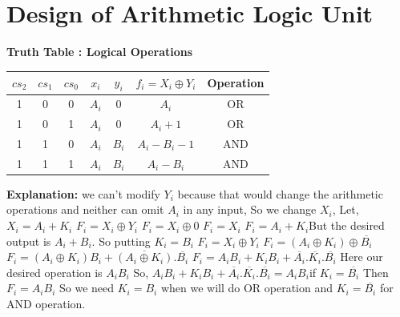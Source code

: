 \documentclass[12pt]{extarticle}
\begin{document}
	\section{Design of Arithmetic Logic Unit}
	\textbf{Truth Table : Logical Operations}
	\begin{center}
		\begin{tabular}{ |c|c|c|c|c|c|c| } 
			\hline
			$cs_2$ & $cs_1$ & $cs_0$ & $x_i$ & $y_i$ & $f_i=X_i \oplus Y_i$ & Operation \\
			\hline
			
			\hline
			1 & 0 & 0 & $A_i$ & $0$ & $A_i$ & OR \\
			\hline
			
			\hline
			1 & 0 & 1 & $A_i$ & $0$ & $A_i+1$ & OR \\
			\hline
			
			\hline
			1 & 1 & 0 & $A_i$ & $B_i$ & $A_i-B_i-1$ & AND \\
			\hline
			
			\hline
			1 & 1 & 1 & $A_i$ & $B_i$ & $A_i-B_i$ & AND\\
			\hline
		\end{tabular}
	\end{center}\textbf{Explanation:}\newline
	we can't modify $Y_i$ because that would change the arithmetic operations
	and neither can omit $A_i$ in any input, So we change $X_i$,\newline
	Let, $X_i=A_i+K_i$ \newline
	$F_i=X_i \oplus Y_i$ \newline
	$F_i=X_i \oplus 0$ \newline
	$F_i=X_i$ \newline
	$F_i=A_i+K_i$\newline But the desired output is $A_i+B_i$. So putting $K_i=B_i$ \newline
	$F_i=X_i \oplus Y_i$\newline
	$F_i=(A_i \oplus K_i) \oplus \overline{B_i}$\newline
	$F_i=(A_i \oplus K_i)B_i + \overline{(A_i \oplus K_i)} .\overline{B_i}$\newline
	$F_i=A_iB_i + K_iB_i + \overline{A_i}.\overline{K_i}.\overline{B_i}$ \newline Here our desired operation is $A_iB_i$ \newline
	So, $A_iB_i + K_iB_i + \overline{A_i}.\overline{K_i}.\overline{B_i} = A_iB_i$\newline if $K_i=\overline{B_i}$	Then $F_i=A_iB_i$\newline
	So we need $K_i=B_i$ when we will do OR operation and $K_i=\overline{B_i}$ for AND operation.
	
\end{document}
